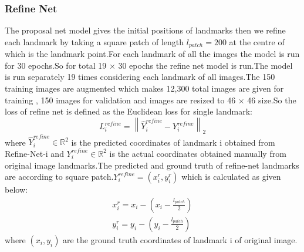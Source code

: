 \documentclass[sn-mathphys]{sn-jnl}%
\theoremstyle{thmstyleone}%
\theoremstyle{thmstyletwo}%
\theoremstyle{thmstylethree}%
\begin{document}
\subsubsection{Refine Net}
The  proposal net model gives the initial positions of landmarks then we refine each landmark by taking a square  patch of length \begin{math} l_{patch} = 200 \end{math} at the centre of which is the landmark point.For each landmark of all the images the model is run for 30 epochs.So for total 19 × 30 epochs the refine net model is run.The model is run separately 19 times considering each landmark of all images.The 150 training images are augmented which makes 12,300 total images are given for training , 150 images for validation and images are resized to 46 × 46 size.So the loss of refine net is defined as the Euclidean loss for single landmark:  \begin{equation}
    L_{i}^{refine} = \left \| \hat{Y}_{i}^{refine} - Y_{i}^{refine} \right \|_{2}
\end{equation}
where \begin{math} \hat{Y}_{i}^{refine} \in \mathbb{R}^{2} \end{math} is the predicted coordinates of landmark i obtained from Refine-Net-i and \begin{math} Y_{i}^{refine} \in \mathbb{R}^{2} \end{math} is the actual coordinates obtained manually from original image landmarks.The predicted and ground truth of refine-net landmarks are according to square patch.\begin{math} Y_{i}^{refine} = (x^{r}_{i},y^{r}_{i}) \end{math} which is calculated as given below:
\begin{align*}
    x_{i}^{r} = x_{i} - (x_{i} - \frac{l_{patch}}{2}) \\
    y_{i}^{r} = y_{i} - (y_{i} - \frac{l_{patch}}{2})
\end{align*}
 where \begin{math}(x_{i},y_{i}) \end{math} are the ground truth
coordinates of landmark i of original image.
\end{document}
